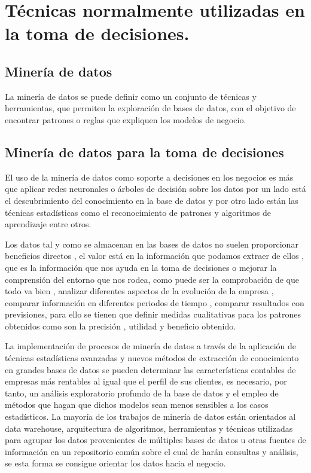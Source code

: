 \section{Técnicas normalmente utilizadas en la toma de decisiones.} 
\subsection{Minería de datos} 
La minería de datos se puede definir como un conjunto de técnicas y herramientas, que permiten la exploración de bases de datos, con el objetivo de encontrar patrones o reglas que expliquen los modelos de negocio. 

\subsection*{Minería de datos para la toma de decisiones} 

El uso de la minería de datos como soporte a decisiones en los negocios es más que aplicar redes neuronales o árboles de decisión sobre los datos  por un lado está el descubrimiento del conocimiento en la base de datos y por otro lado están las técnicas estadísticas como el reconocimiento de patrones y algoritmos de aprendizaje entre otros.\cite{R. Lopez.}

Los datos tal y como se almacenan en las bases de datos no suelen proporcionar beneficios directos , el valor está en la información que podamos extraer de ellos , que es la información que nos ayuda en la toma de decisiones o mejorar la comprensión del entorno que nos rodea, como puede ser la comprobación de que todo va bien , analizar diferentes aspectos de la evolución de la empresa , comparar información en diferentes periodos de tiempo , comparar resultados con previsiones, para ello se tienen que definir medidas cualitativas para los patrones obtenidos como son la precisión , utilidad y beneficio obtenido. \cite{R. Lopez.}

La implementación de procesos de minería de datos a través de la aplicación de técnicas estadísticas avanzadas y nuevos métodos de extracción de conocimiento en grandes bases de datos se pueden determinar las características contables de empresas más rentables al igual que el perfil de sus clientes, es necesario, por tanto, un análisis exploratorio profundo de la base de datos y el empleo de métodos que hagan que dichos modelos sean menos sensibles a los casos estadísticos. La mayoría de los trabajos de minería de datos están orientados al data warehouse, arquitectura de algoritmos, herramientas y técnicas utilizadas para agrupar los datos provenientes de múltiples bases de datos u otras fuentes de información en un repositorio común sobre el cual de harán consultas y análisis, se esta forma se consigue orientar los datos hacia el negocio.\cite{R. Lopez.}\cite{MineriaDatos}


